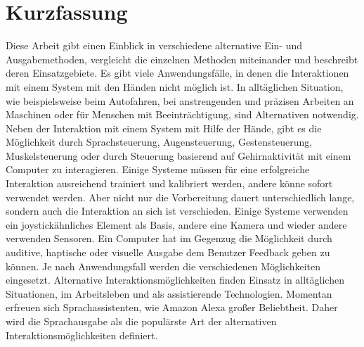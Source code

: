 \chapter{Kurzfassung}
Diese Arbeit gibt einen Einblick in verschiedene alternative Ein- und Ausgabemethoden, vergleicht die einzelnen Methoden miteinander und beschreibt deren Einsatzgebiete.
\newline \newline
Es gibt viele Anwendungsfälle, in denen die Interaktionen mit einem System mit den
Händen nicht möglich ist. In alltäglichen Situation, wie beispielsweise beim Autofahren,
bei anstrengenden und präzisen Arbeiten an Maschinen oder für Menschen mit
Beeinträchtigung, sind Alternativen notwendig.
\newline \newline
Neben der Interaktion mit einem System mit Hilfe der Hände, gibt es die Möglichkeit durch Sprachsteuerung, Augensteuerung, Gestensteuerung, Muskelsteuerung oder durch Steuerung basierend auf Gehirnaktivität mit einem Computer zu interagieren. Einige Systeme müssen für eine erfolgreiche Interaktion ausreichend trainiert und kalibriert werden, andere könne sofort verwendet werden. Aber nicht nur die Vorbereitung dauert unterschiedlich lange, sondern auch die Interaktion an sich ist verschieden. Einige Systeme verwenden ein joystickähnliches Element als Basis, andere eine Kamera und wieder andere verwenden Sensoren.
\newline \newline
Ein Computer hat im Gegenzug die Möglichkeit durch auditive, haptische oder visuelle Ausgabe dem Benutzer Feedback geben zu können. Je nach Anwendungsfall werden die verschiedenen Möglichkeiten eingesetzt.
\newline \newline
Alternative Interaktionsmöglichkeiten finden Einsatz in alltäglichen Situationen, im Arbeitsleben und als assistierende Technologien. Momentan erfreuen sich Sprachassistenten, wie Amazon Alexa großer Beliebtheit. Daher wird die Sprachausgabe als die populärste Art der alternativen Interaktionsmöglichkeiten definiert.
 
